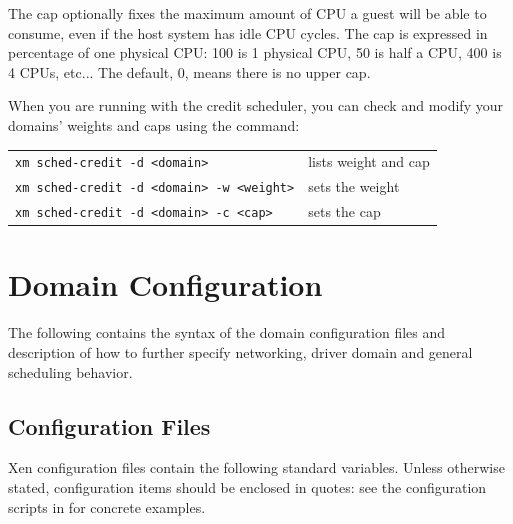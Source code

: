 \documentclass[11pt,twoside,final,openright]{report}
\begin{document}
The cap optionally fixes the maximum amount of CPU a guest will
be able to consume, even if the host system has idle CPU cycles.
The cap is expressed in percentage of one physical CPU: 100 is
1 physical CPU, 50 is half a CPU, 400 is 4 CPUs, etc... The
default, 0, means there is no upper cap.

When you are running with the credit scheduler, you can check and
modify your domains' weights and caps using the 
command:

\begin{tabular}{ll}
\verb!xm sched-credit -d <domain>! & lists weight and cap \\
\verb!xm sched-credit -d <domain> -w <weight>! & sets the weight \\
\verb!xm sched-credit -d <domain> -c <cap>! & sets the cap
\end{tabular}



\chapter{Domain Configuration}
\label{cha:config}

The following contains the syntax of the domain configuration files
and description of how to further specify networking, driver domain
and general scheduling behavior.


\section{Configuration Files}
\label{s:cfiles}

Xen configuration files contain the following standard variables.
Unless otherwise stated, configuration items should be enclosed in
quotes: see the configuration scripts in  
for concrete examples. 
\end{document}
